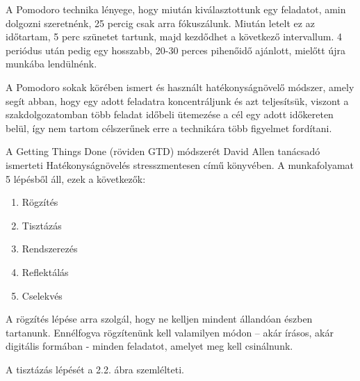  

A Pomodoro technika lényege, hogy miután kiválasztottunk egy feladatot, amin dolgozni szeretnénk, 25 percig csak arra fókuszálunk. Miután letelt ez az időtartam, 5 perc szünetet tartunk, majd kezdődhet a következő intervallum. 4 periódus után pedig egy hosszabb, 20-30 perces pihenőidő ajánlott, mielőtt újra munkába lendülnénk.

A Pomodoro sokak körében ismert és használt hatékonyságnövelő módszer, amely segít abban, hogy egy adott feladatra koncentráljunk és azt teljesítsük, viszont a szakdolgozatomban több feladat időbeli ütemezése a cél egy adott időkereten belül, így nem tartom célszerűnek erre a technikára több figyelmet fordítani.


A Getting Things Done (röviden GTD) módszerét David Allen tanácsadó ismerteti Hatékonyságnövelés stresszmentesen című könyvében. A munkafolyamat 5 lépésből áll, ezek a következők:
\begin{enumerate}
\item Rögzítés
\item Tisztázás
\item Rendszerezés
\item Reflektálás
\item Cselekvés
\end{enumerate}

A rögzítés lépése arra szolgál, hogy ne kelljen mindent állandóan észben tartanunk. Ennélfogva rögzítenünk kell valamilyen módon – akár írásos, akár digitális formában - minden feladatot, amelyet meg kell csinálnunk.

A tisztázás lépését a 2.2. ábra szemlélteti.

